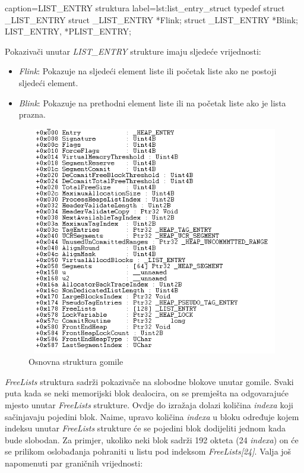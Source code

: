 \documentclass[times, utf8, diplomski, numeric]{fer}
\begin{document}
\begin{struktura} {caption=LIST\_ENTRY struktura} {label=lst:list_entry_struct}
typedef struct _LIST_ENTRY {
  struct _LIST_ENTRY  *Flink;
  struct _LIST_ENTRY  *Blink;
} LIST_ENTRY, *PLIST_ENTRY;
\end{struktura}

Pokazivači unutar \emph{LIST\_ENTRY} strukture imaju sljedeće vrijednosti:

\begin{itemize}
\item \emph{Flink}: Pokazuje na sljedeći element liste ili početak liste ako ne postoji sljedeći element.
\item \emph{Blink}: Pokazuje na prethodni element liste ili na početak liste ako je lista prazna.
\end{itemize}

\begin{figure}[!ht]
\centering
\setlength\fboxsep{0pt}
\setlength\fboxrule{0.5pt}
\includegraphics[width=12cm, height=10cm]{slike/heap_structure}
\caption{Osnovna struktura gomile \citep{heapOverflow_infosec}}
\label{fig:heap_structure} 
\end{figure}

\emph{FreeLists} struktura sadrži pokazivače na slobodne blokove
unutar gomile. Svaki puta kada se neki memorijski blok dealocira,
on se premješta na odgovarajuće mjesto unutar \emph{FreeLists}
strukture. Ovdje do izražaja dolazi količina \emph{indexa} koji
sačinjavaju pojedini blok. Naime, upravo količina \emph{indexa} u
bloku određuje kojem indeksu unutar \emph{FreeLists} strukture će
se pojedini blok dodijeliti jednom kada bude slobodan. Za
primjer, ukoliko neki blok sadrži 192 okteta (24 \emph{indexa}) 
on će se prilikom oslobađanja pohraniti u listu pod indeksom
\emph{FreeLists[24]}. Valja još napomenuti par graničnih
vrijednosti:
\end{document}
